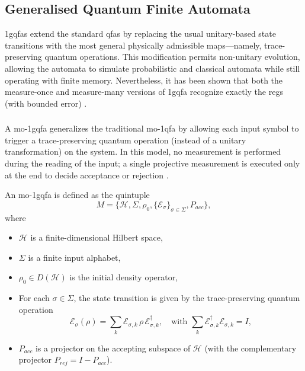 \subsection{Generalised Quantum Finite Automata}
\label{sec:generalised-qfa}
\glspl{1gqfa} extend the standard \glspl{qfa} by replacing the usual unitary-based state transitions with the most general physically admissible maps—namely, trace-preserving quantum operations. This modification permits non-unitary evolution, allowing the automata to simulate probabilistic and classical automata while still operating with finite memory. Nevertheless, it has been shown that both the measure-once and measure-many versions of \gls{1gqfa} recognize exactly the \glspl{reg} (with bounded error) \cite{li2012characterizations}.

\subsubsection{}
A \gls{mo-1gqfa} generalizes the traditional \gls{mo-1qfa} by allowing each input symbol to trigger a trace-preserving quantum operation (instead of a unitary transformation) on the system. In this model, no measurement is performed during the reading of the input; a single projective measurement is executed only at the end to decide acceptance or rejection \cite{li2012characterizations}.

\begin{definition}
An \gls{mo-1gqfa} is defined as the quintuple
\[
M = \{ \mathcal{H},\Sigma,\rho_0,\{\mathcal{E}_\sigma\}_{\sigma\in\Sigma},P_{acc}\},
\]
where
\begin{itemize}
  \item $\mathcal{H}$ is a finite-dimensional Hilbert space,
  \item $\Sigma$ is a finite input alphabet,
  \item $\rho_0\in D(\mathcal{H})$ is the initial density operator,
  \item For each $\sigma\in\Sigma$, the state transition is given by the trace-preserving quantum operation 
  \[
  \mathcal{E}_\sigma(\rho)=\sum_{k} \mathcal{E}_{\sigma,k}\,\rho\,\mathcal{E}_{\sigma,k}^\dagger,\quad \text{with } \sum_{k} \mathcal{E}_{\sigma,k}^\dagger \mathcal{E}_{\sigma,k}=I,
  \]
  \item $P_{acc}$ is a projector on the accepting subspace of $\mathcal{H}$ (with the complementary projector $P_{rej}=I-P_{acc}$).
\end{itemize}
\end{definition}

